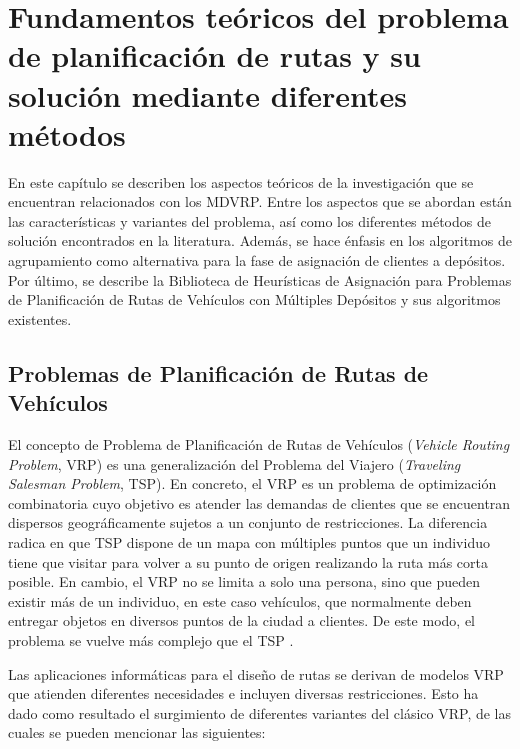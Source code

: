 \chapter{Fundamentos teóricos del problema de planificación de rutas y su solución mediante diferentes métodos}\label{cap:fundamentos}

En este capítulo se describen los aspectos teóricos de la investigación que se encuentran relacionados con los MDVRP. Entre los aspectos que se abordan están las características y variantes del problema, así como los diferentes métodos de solución encontrados en la literatura. Además, se hace énfasis en los algoritmos de agrupamiento como alternativa para la fase de asignación de clientes a depósitos. Por último, se describe la Biblioteca de Heurísticas de Asignación para Problemas de Planificación de Rutas de Vehículos con Múltiples Depósitos y sus algoritmos existentes.

\section{Problemas de Planificación de Rutas de Vehículos}

El concepto de Problema de Planificación de Rutas de Vehículos (\textit{Vehicle Routing Problem}, VRP) es una generalización del Problema del Viajero (\textit{Traveling Salesman Problem}, TSP). En concreto, el VRP es un problema de optimización combinatoria cuyo objetivo es atender las demandas de clientes que se encuentran dispersos geográficamente sujetos a un conjunto de restricciones. La diferencia radica en que TSP dispone de un mapa con múltiples puntos que un individuo tiene que visitar para volver a su punto de origen realizando la ruta más corta posible. En cambio, el VRP no se limita a solo una persona, sino que pueden existir más de un individuo, en este caso vehículos, que normalmente deben entregar objetos en diversos puntos de la ciudad a clientes. De este modo, el problema se vuelve más complejo que el TSP \parencite{kumarSurveyVehicleRouting2012}.

Las aplicaciones informáticas para el dise\~no de rutas se derivan de modelos VRP que atienden diferentes necesidades e incluyen diversas restricciones. Esto ha dado como resultado el surgimiento de diferentes variantes del clásico VRP, de las cuales se pueden mencionar las siguientes:

